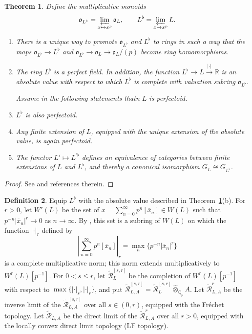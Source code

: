 \documentclass[12pt]{amsart}
\newtheorem{theorem}{Theorem}[section]
\theoremstyle{definition}
\newtheorem{defn}[theorem]{Definition}
\numberwithin{equation}{theorem}
\newcommand{\QQ}{\mathbb{Q}}
\newcommand{\RR}{\mathbb{R}}
\newcommand{\calR}{\mathcal{R}}
\newcommand{\frako}{\mathfrak{o}}
\begin{document}
\begin{theorem} \label{T:perfectoid}
Define the multiplicative monoids
\[
\frako_{L^{\flat}} = \varprojlim_{x \mapsto x^p} \frako_L, \qquad
L^{\flat} = \varprojlim_{x \mapsto x^p} L.
\]
\begin{enumerate}
\item[(a)]
There is a unique way to promote $\frako_{L^{\flat}}$ and $L^{\flat}$ to rings
in such a way that the maps $\frako_{L^{\flat}} \to L^{\flat}$ and $\frako_{L^{\flat}} \to \frako_L \to \frako_L/(p)$ become ring homomorphisms.
\item[(b)]
The ring $L^{\flat}$ is a perfect field. In addition,
the function $L^{\flat} \to L \stackrel{\left| \cdot \right|}{\to} \RR$ is an absolute value with respect to which $L^{\flat}$ is complete with valuation subring $\frako_{L^{\flat}}$.

Assume in the following statements thatn $L$ is perfectoid.

\item[(c)]
$L^\flat$ is also perfectoid.
\item[(d)]
Any finite extension of $L$, equipped with the unique extension of the absolute value, is again perfectoid.
\item[(e)]
The functor $L' \mapsto L^{\prime \flat}$ defines an equivalence of categories between finite extensions of $L$ and $L^{\flat}$, and thereby a canonical isomorphism $G_L \cong G_{L^{\flat}}$.
\end{enumerate}
\end{theorem}
\begin{proof}
See \cite[\S 1]{kedlaya-new-phigamma} and references therein.
\end{proof}

\begin{defn}
Equip $L^\flat$ with the absolute value described in 
Theorem~\ref{T:perfectoid}(b). 
For $r>0$, let $W^r(L)$ be the set of $x = \sum_{n=0}^\infty p^n [\overline{x}_n] \in W(L)$ such that $p^{-n} \left| \overline{x}_n \right|^r \to 0$ as $n \to \infty$.
By \cite[Proposition~5.1.2]{kedlaya-liu1}, this set is a subring of $W(L)$ on which 
the function $\left| \cdot \right|_r$ defined by
\[
\left| \sum_{n=0}^\infty p^n [\overline{x}_n]  \right|_r = \max_n \{p^{-n} \left| \overline{x}_n \right|^r\}
\]
is a complete multiplicative norm; this norm extends multiplicatively to $W^r(L)[p^{-1}]$.
For $0 < s \leq r$, let $\tilde{\calR}^{[s,r]}_L$ be the completion of $W^r(L)[p^{-1}]$
with respect to $\max\{\left| \cdot \right|_s, \left| \cdot \right|_r\}$,
and put $\tilde{\calR}^{[s,r]}_{L,A} = \tilde{\calR}^{[s,r]}_L \widehat{\otimes}_{\QQ_p} A$.
Let $\tilde{\calR}^r_{L,A}$ be the inverse limit of the $\tilde{\calR}^{[s,r]}_{L,A}$ over all $s \in (0,r)$, equipped with the Fr\'echet topology. Let $\tilde{\calR}_{L,A}$ be the direct  limit of the $\tilde{\calR}^r_{L,A}$ over all $r>0$, equipped with the locally convex direct limit topology (LF topology).
\end{defn}
\end{document}
